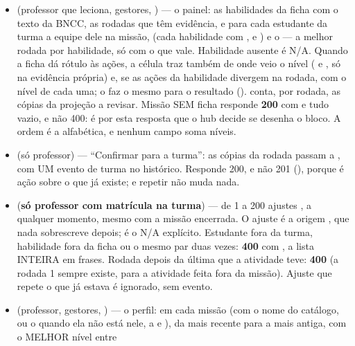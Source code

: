 \begin{itemize}
  \item {}
    (professor que leciona, gestores, ) --- o painel: as habilidades da
    ficha com o texto da BNCC, as rodadas que têm evidência, e para cada
    estudante da turma a equipe dele na missão,  (cada habilidade
    com ,  e ) e o  --- a
    melhor rodada por habilidade, só com o que vale. Habilidade ausente é N/A.
    Quando a ficha dá rótulo às ações, a célula traz também de onde veio o
    nível ( e , só na evidência própria) e, se as ações
    da habilidade divergem na rodada,  com o nível de cada uma; o
     faz o mesmo para o resultado ().
     conta, por rodada, as cópias da projeção a revisar. Missão
    SEM ficha responde \textbf{200} com  e tudo vazio, e não
    400: é por esta resposta que o hub decide se desenha o bloco. A ordem é a
    alfabética, e nenhum campo soma níveis.
  \item {} (só professor) ---
    \enquote{Confirmar para a turma}: as cópias  da rodada
    passam a , com UM evento de turma no histórico. Responde 200,
    e não 201 (), porque é ação sobre o que já existe; e
    repetir não muda nada.
  \item {} (\textbf{só professor com
    matrícula na turma}) --- de 1 a 200 ajustes
    , a qualquer momento, mesmo com a
    missão encerrada. O ajuste é a origem , que nada sobrescreve
    depois;  é o N/A explícito. Estudante fora da turma,
    habilidade fora da ficha ou o mesmo par duas vezes: \textbf{400}
     com , a lista INTEIRA em frases. Rodada
    depois da última que a atividade teve: \textbf{400}
     (a rodada 1 sempre existe, para a atividade feita
    fora da missão). Ajuste que repete o que já estava é ignorado, sem evento.
  \item {} (professor, gestores,
    ) --- o perfil: em cada missão (com o nome do catálogo, ou o
     quando ela não está nele, a  e ), da
    mais recente para a mais antiga,  com o MELHOR nível entre

\end{itemize}
